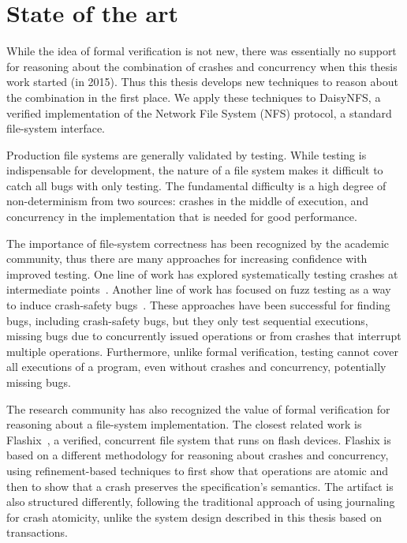 \section{State of the art}
\label{sec:intro:related}

While the idea of formal verification is not new, there was essentially no
support for reasoning about the combination of crashes and concurrency when this
thesis work started (in 2015). Thus this thesis develops new techniques to
reason about the combination in the first place. We apply these techniques to
DaisyNFS, a verified implementation of the Network File System (NFS) protocol, a
standard file-system interface.

Production file systems are generally validated by testing. While testing is
indispensable for development, the nature of a file system makes it difficult to
catch all bugs with only testing. The fundamental difficulty is a high degree of
non-determinism from two sources: crashes in the middle of execution, and
concurrency in the implementation that is needed for good performance.

The importance of file-system correctness has been recognized by the academic
community, thus there are many approaches for increasing confidence with
improved testing. One line of work has explored systematically testing crashes
at intermediate points~\cite{mohan:crashmonkey,pillai:appcrash,yang:explode}. Another line of
work has focused on fuzz testing as a way to induce crash-safety
bugs~\cite{xu:janus,kim:hydra}. These approaches have been successful for
finding bugs, including crash-safety bugs, but they only test sequential
executions, missing bugs due to concurrently issued operations or from crashes
that interrupt multiple operations. Furthermore, unlike formal verification, testing cannot
cover all executions of a program, even without crashes and concurrency,
potentially missing bugs.

The research community has also recognized the value of formal verification for
reasoning about a file-system implementation. The closest related work is
Flashix~\cite{bodenmuller:concurrent-flashix}, a verified, concurrent file
system that runs on flash devices. Flashix is based on a different methodology for
reasoning about crashes and concurrency, using refinement-based techniques to
first show that operations are atomic and then to show that a crash preserves
the specification's semantics. The artifact is also structured differently,
following the traditional approach of using journaling for crash atomicity,
unlike the system design described in this thesis based on transactions.

